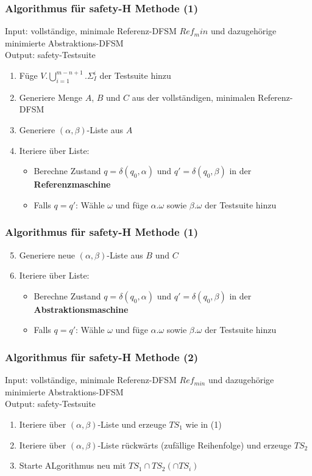 \documentclass[10pt]{beamer}
\begin{document}
\begin{frame}
\frametitle{Algorithmus für safety-H Methode (1)}
Input: vollständige, minimale Referenz-DFSM $Ref_min$ und dazugehörige minimierte Abstraktions-DFSM\\
Output: safety-Testsuite
\begin{enumerate}
  \item Füge $V.\bigcup\limits_{i=1}^{m-n+1}.\Sigma_I^i$ der Testsuite hinzu
  \item Generiere Menge $A$, $B$ und $C$ aus der vollständigen, minimalen Referenz-DFSM
  \item Generiere $(\alpha, \beta)$-Liste aus $A$
  \item Iteriere über Liste:
  \begin{itemize}
    \item Berechne Zustand $q = \delta(q_0,\alpha)$ und $q'=\delta(q_0,\beta)$ in der \textbf{Referenzmaschine}
    \item Falls $q = q'$: Wähle $\omega$ und füge $\alpha.\omega$ sowie $\beta.\omega$ der Testsuite hinzu
  \end{itemize}
\end{enumerate}
\end{frame}

\begin{frame}
\frametitle{Algorithmus für safety-H Methode (1)}
\begin{enumerate}
  \setcounter{enumi}{4}
  \item Generiere neue $(\alpha, \beta)$-Liste aus $B$ und $C$
  \item Iteriere über Liste:
  \begin{itemize}
    \item Berechne Zustand $q = \delta(q_0,\alpha)$ und $q'=\delta(q_0,\beta)$ in der \textbf{Abstraktionsmaschine}
    \item Falls $q = q'$: Wähle $\omega$ und füge $\alpha.\omega$ sowie $\beta.\omega$ der Testsuite hinzu
  \end{itemize}
\end{enumerate}
\end{frame}

\begin{frame}
\frametitle{Algorithmus für safety-H Methode (2)}
Input: vollständige, minimale Referenz-DFSM $Ref_{min}$ und dazugehörige minimierte Abstraktions-DFSM\\
Output: safety-Testsuite
\begin{enumerate}
  \item Iteriere über $(\alpha,\beta)$-Liste und erzeuge $TS_1$ wie in (1)
  \item Iteriere über $(\alpha,\beta)$-Liste rückwärts (zufällige Reihenfolge) und erzeuge $TS_2$
  \item Starte ALgorithmus neu mit $TS_1 \cap TS_2 (\cap TS_i)$
\end{enumerate}
\end{frame}
\end{document}
